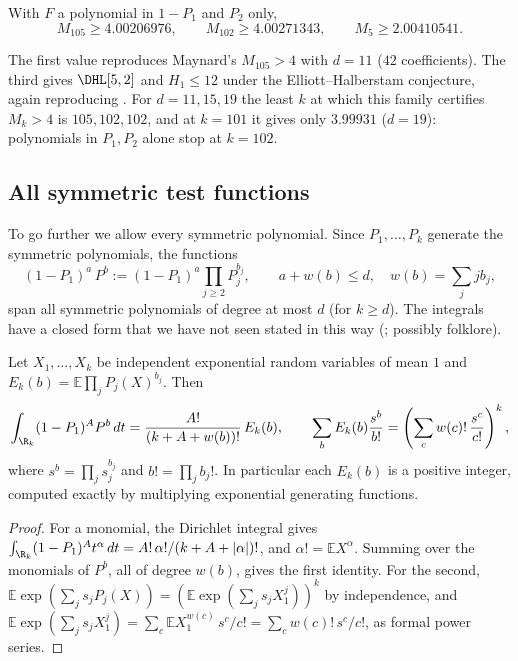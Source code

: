 \begin{theorem}\label{thm:Mk0}
With $F$ a polynomial in $1-P_1$ and $P_2$ only,
\[
M_{105}\ge4.00206976,\qquad M_{102}\ge4.00271343,\qquad M_{5}\ge2.00410541 .
\]
\end{theorem}

The first value reproduces Maynard's $M_{105}>4$ with $d=11$ ($42$
coefficients). The third gives $\DHL[5,2]$ and $H_1\le12$ under the
Elliott--Halberstam conjecture, again reproducing \cite{May15}. For
$d=11,15,19$ the least $k$ at which this family certifies $M_k>4$ is
$105,102,102$, and at $k=101$ it gives only $3.99931$ ($d=19$): polynomials in
$P_1,P_2$ alone stop at $k=102$.

\subsection{All symmetric test functions}
To go further we allow every symmetric polynomial. Since $P_1,\dots,P_k$
generate the symmetric polynomials, the functions
\[
(1-P_1)^a\,P^{b}:=(1-P_1)^a\prod_{j\ge2}P_j^{b_j},\qquad a+w(b)\le d,\quad w(b)=\sum_j jb_j,
\]
span all symmetric polynomials of degree at most $d$ (for $k\ge d$). The
integrals have a closed form that we have not seen stated in this way
(; possibly folklore).

\begin{lemma}\label{lem:egf}
Let $X_1,\dots,X_k$ be independent exponential random variables of mean $1$
and $E_k(b)=\mathbb E\prod_jP_j(X)^{b_j}$. Then
\[
\int_{\R_k}(1-P_1)^AP^{b}\,dt=\frac{A!}{(k+A+w(b))!}\,E_k(b),
\qquad
\sum_b E_k(b)\frac{s^b}{b!}=\left(\sum_{c}w(c)!\,\frac{s^c}{c!}\right)^{k},
\]
where $s^b=\prod_js_j^{b_j}$ and $b!=\prod_jb_j!$. In particular each
$E_k(b)$ is a positive integer, computed exactly by multiplying
exponential generating functions.
\end{lemma}

\begin{proof}
For a monomial, the Dirichlet integral gives
$\int_{\R_k}(1-P_1)^At^\alpha\,dt=A!\,\alpha!/(k+A+|\alpha|)!$, and
$\alpha!=\mathbb EX^\alpha$. Summing over the monomials of $P^b$, all of
degree $w(b)$, gives the first identity. For the second,
$\mathbb E\exp(\sum_js_jP_j(X))=\left(\mathbb E\exp(\sum_js_jX_1^j)\right)^k$
by independence, and
$\mathbb E\exp(\sum_js_jX_1^j)=\sum_c\mathbb E X_1^{w(c)}\,s^c/c!=\sum_cw(c)!\,s^c/c!$,
as formal power series.
\end{proof}

